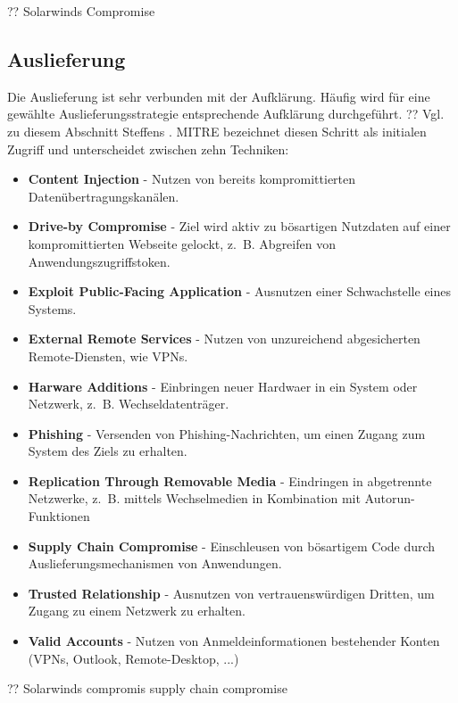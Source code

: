 \documentclass[conference]{IEEEtran}
\begin{document}
?? Solarwinds Compromise

\subsection{Auslieferung}
Die Auslieferung ist sehr verbunden mit der Aufklärung.
Häufig wird für eine gewählte Auslieferungsstrategie entsprechende Aufklärung durchgeführt.
??
Vgl. zu diesem Abschnitt Steffens \cite[S.~10-13]{Steffens2020}.
MITRE \cite{MITREInitialAccess} bezeichnet diesen Schritt als initialen Zugriff und unterscheidet zwischen zehn Techniken:
\begin{itemize}
    \item \textbf{Content Injection} - Nutzen von bereits kompromittierten Datenübertragungskanälen.
    \item \textbf{Drive-by Compromise} - Ziel wird aktiv zu bösartigen Nutzdaten auf einer kompromittierten Webseite gelockt, z.~B. Abgreifen von Anwendungszugriffstoken.
    \item \textbf{Exploit Public-Facing Application} - Ausnutzen einer Schwachstelle eines Systems.
    \item \textbf{External Remote Services} - Nutzen von unzureichend abgesicherten Remote-Diensten, wie VPNs.
    \item \textbf{Harware Additions} - Einbringen neuer Hardwaer in ein System oder Netzwerk, z.~B. Wechseldatenträger.
    \item \textbf{Phishing} - Versenden von Phishing-Nachrichten, um einen Zugang zum System des Ziels zu erhalten.
    \item \textbf{Replication Through Removable Media} - Eindringen in abgetrennte Netzwerke, z.~B. mittels Wechselmedien in Kombination mit Autorun-Funktionen
    \item \textbf{Supply Chain Compromise} - Einschleusen von bösartigem Code durch Auslieferungsmechanismen von Anwendungen.
    \item \textbf{Trusted Relationship} - Ausnutzen von vertrauenswürdigen Dritten, um Zugang zu einem Netzwerk zu erhalten.
    \item \textbf{Valid Accounts} - Nutzen von Anmeldeinformationen bestehender Konten (VPNs, Outlook, Remote-Desktop, ...)
\end{itemize}

?? Solarwinds compromis supply chain compromise
\end{document}

